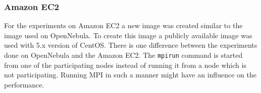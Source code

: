 \subsubsection*{Amazon EC2}
For the experiments on Amazon EC2 a new image was created similar to the image used on OpenNebula. To create this image a publicly available image was used with 5.x version of CentOS. There is one difference between the experiments done on OpenNebula and the Amazon EC2. The \texttt{mpirun} command is started from one of the participating nodes instead of running it from a node which is not participating. Running MPI in such a manner might have an influence on the performance.